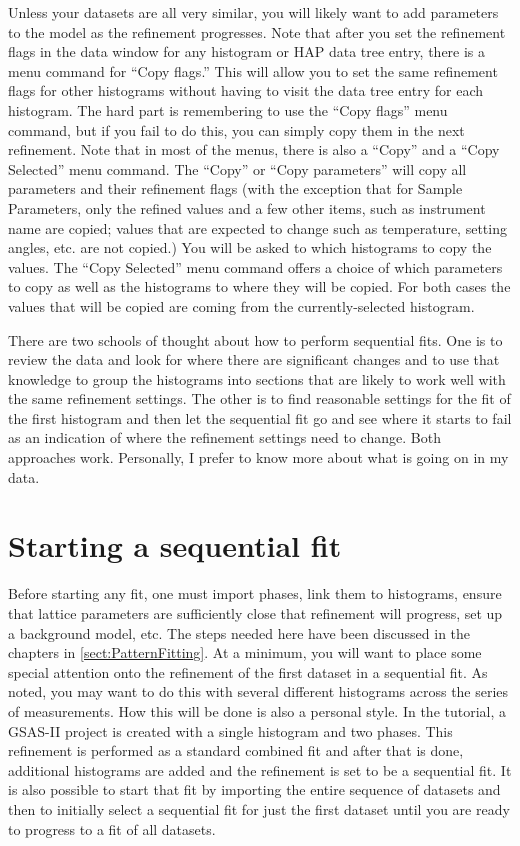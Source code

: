 Unless your datasets are all very similar, you will likely want to add parameters to the model as the refinement progresses. Note that after you set the refinement flags in the data window for any histogram or HAP data tree entry, there is a menu command for ``Copy flags.'' This will allow you to set the same refinement flags for other histograms without having to visit the data tree entry for each histogram. The hard part is remembering to use the ``Copy flags'' menu command, but if you fail to do this, you can simply copy them in the next refinement. Note that in most of the menus, there is also a ``Copy'' and a ``Copy Selected'' menu command. The ``Copy'' or  ``Copy parameters'' will copy all parameters and their refinement flags (with the exception that for Sample Parameters, only the refined values and a few other items, such as instrument name are copied; values that are expected to change such as temperature, setting angles, etc. are not copied.) You will be asked to which histograms to copy the values. The ``Copy Selected'' menu command offers a choice of which parameters to copy as well as the histograms to where they will be copied. For both cases the values that will be copied are coming from the currently-selected histogram. 

There are two schools of thought about how to perform sequential fits. One is to review the data and look for where there are significant changes and to use that knowledge to group the histograms into sections that are likely to work well with the same refinement settings. The other is to find reasonable settings for the fit of the first histogram and then let the sequential fit go and see where it starts to fail  as an indication of where the refinement settings need to change. Both approaches work. Personally, I prefer to know more about what is going on in my data. 

\section{Starting a sequential fit}\label{ref:prepseq}
Before starting any fit, one must import phases, link them to histograms, ensure that lattice parameters are sufficiently close that refinement will progress, set up a background model, etc. The steps needed here have been discussed in the chapters in \ref{sect:PatternFitting}. At a minimum, you will want to place some special attention onto the refinement of the first dataset in a sequential fit. As noted, you may want to do this with several different histograms across the series of measurements. How this will be done is also a personal style. In the tutorial, a GSAS-II project is created with a single histogram and two phases. This refinement is performed as a standard combined fit and after that is done, additional histograms are added and the refinement is set to be a sequential fit. It is also possible to start that fit by importing the entire sequence of datasets and then to initially select a sequential fit for just the first dataset until you are ready to progress to a fit of all datasets. 


